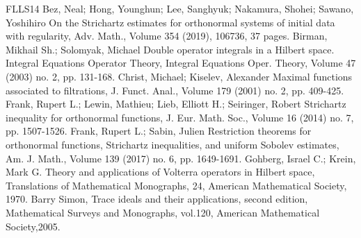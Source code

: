 
\begin{thebibliography}{FLLS14}
 Bez, Neal; Hong, Younghun; Lee, Sanghyuk; Nakamura, Shohei; Sawano, Yoshihiro On the Strichartz estimates for orthonormal systems of initial data with regularity, Adv. Math., Volume 354 (2019), 106736, 37 pages.
 Birman, Mikhail Sh.; Solomyak, Michael Double operator integrals in a Hilbert space. Integral Equations Operator Theory, Integral Equations Oper. Theory, Volume 47 (2003) no. 2, pp. 131-168.
 Christ, Michael; Kiselev, Alexander Maximal functions associated to filtrations, J. Funct. Anal., Volume 179 (2001) no. 2, pp. 409-425.
 Frank, Rupert L.; Lewin, Mathieu; Lieb, Elliott H.; Seiringer, Robert Strichartz inequality for orthonormal functions, J. Eur. Math. Soc., Volume 16 (2014) no. 7, pp. 1507-1526.
 Frank, Rupert L.; Sabin, Julien Restriction theorems for orthonormal functions, Strichartz inequalities, and uniform Sobolev estimates, Am. J. Math., Volume 139 (2017) no. 6, pp. 1649-1691.
 Gohberg, Israel C.; Krein, Mark G. Theory and applications of Volterra operators in Hilbert space, Translations of Mathematical Monographs, 24, American Mathematical Society, 1970.
 Barry Simon, Trace ideals and their applications, second edition, Mathematical Surveys and Monographs, vol.120, American Mathematical Society,2005.
\end{thebibliography}
